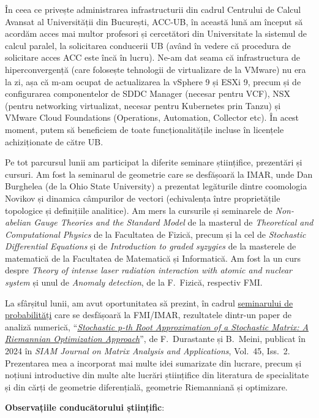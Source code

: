 În ceea ce privește administrarea infrastructurii din cadrul Centrului de Calcul Avansat al Universității din București, ACC-UB, în această lună am început să acordăm acces mai multor profesori și cercetători din Universitate la sistemul de calcul paralel, la solicitarea conducerii UB (având în vedere că procedura de solicitare acces ACC este încă în lucru). Ne-am dat seama că infrastructura de hiperconvergență (care folosește tehnologii de virtualizare de la VMware) nu era la zi, așa că m-am ocupat de actualizarea la vSphere 9 și ESXi 9, precum și de configurarea componentelor de SDDC Manager (necesar pentru VCF), NSX (pentru networking virtualizat, necesar pentru Kubernetes prin Tanzu) și VMware Cloud Foundations (Operations, Automation, Collector etc). În acest moment, putem să beneficiem de toate funcționalitățile incluse în licențele achiziționate de către UB.

Pe tot parcursul lunii am participat la diferite seminare științifice, prezentări și cursuri. Am fost la seminarul de geometrie care se desfășoară la IMAR, unde Dan Burghelea (de la Ohio State University) a prezentat legăturile dintre coomologia Novikov și dinamica câmpurilor de vectori (echivalența între proprietățile topologice și definițiile analitice). Am mers la cursurile și seminarele de \textit{Non-abelian Gauge Theories and the Standard Model} de la masterul de \textit{Theoretical and Computational Physics} de la Facultatea de Fizică, precum și la cel de \textit{Stochastic Differential Equations} și de \textit{Introduction to graded syzygies} de la masterele de matematică de la Facultatea de Matematică și Informatică. Am fost la un curs despre \textit{Theory of intense laser radiation interaction with atomic and nuclear system} și unul de \textit{Anomaly detection}, de la F.~Fizică, respectiv FMI.

La sfârșitul lunii, am avut oportunitatea să prezint, în cadrul \href{https://sites.google.com/view/master-probabilitati-fmi/seminarul-stiintific-probabilitati-si-teme-conexe}{seminarului de probabilități} care se desfășoară la FMI/IMAR, rezultatele dintr-un paper de analiză numerică, ``\textit{\href{https://epubs.siam.org/doi/10.1137/23M1589463}{Stochastic p-th Root Approximation of a Stochastic Matrix: A Riemannian Optimization Approach}}'', de F.~Durastante și B.~Meini, publicat în 2024 în \textit{SIAM Journal on Matrix Analysis and Applications}, Vol.~45, Iss.~2. Prezentarea mea a incorporat mai multe idei sumarizate din lucrare, precum și noțiuni introductive din multe alte lucrări științifice din literatura de specialitate și din cărți de geometrie diferențială, geometrie Riemanniană și optimizare.

\textbf{Observațiile conducătorului științific}:

